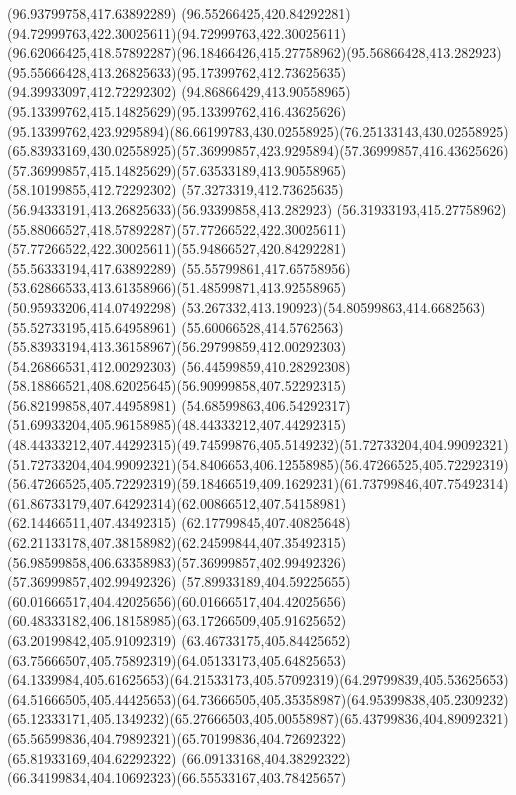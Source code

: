 {{\lineto(96.93799758,417.63892289)
\curveto(96.55266425,420.84292281)(94.72999763,422.30025611)(94.72999763,422.30025611)
\curveto(96.62066425,418.57892287)(96.18466426,415.27758962)(95.56866428,413.282923)
\curveto(95.55666428,413.26825633)(95.17399762,412.73625635)(94.39933097,412.72292302)
\curveto(94.86866429,413.90558965)(95.13399762,415.14825629)(95.13399762,416.43625626)
\curveto(95.13399762,423.9295894)(86.66199783,430.02558925)(76.25133143,430.02558925)
\curveto(65.83933169,430.02558925)(57.36999857,423.9295894)(57.36999857,416.43625626)
\curveto(57.36999857,415.14825629)(57.63533189,413.90558965)(58.10199855,412.72292302)
\curveto(57.3273319,412.73625635)(56.94333191,413.26825633)(56.93399858,413.282923)
\curveto(56.31933193,415.27758962)(55.88066527,418.57892287)(57.77266522,422.30025611)
\curveto(57.77266522,422.30025611)(55.94866527,420.84292281)(55.56333194,417.63892289)
\lineto(55.55799861,417.65758956)
\curveto(53.62866533,413.61358966)(51.48599871,413.92558965)(50.95933206,414.07492298)
\curveto(53.267332,413.190923)(54.80599863,414.6682563)(55.52733195,415.64958961)
\curveto(55.60066528,414.5762563)(55.83933194,413.36158967)(56.29799859,412.00292303)
\lineto(54.26866531,412.00292303)
\lineto(56.44599859,410.28292308)
\curveto(58.18866521,408.62025645)(56.90999858,407.52292315)(56.82199858,407.44958981)
\curveto(54.68599863,406.54292317)(51.69933204,405.96158985)(48.44333212,407.44292315)
\curveto(48.44333212,407.44292315)(49.74599876,405.5149232)(51.72733204,404.99092321)
\curveto(51.72733204,404.99092321)(54.8406653,406.12558985)(56.47266525,405.72292319)
\curveto(56.47266525,405.72292319)(59.18466519,409.1629231)(61.73799846,407.75492314)
\curveto(61.86733179,407.64292314)(62.00866512,407.54158981)(62.14466511,407.43492315)
\curveto(62.17799845,407.40825648)(62.21133178,407.38158982)(62.24599844,407.35492315)
\curveto(56.98599858,406.63358983)(57.36999857,402.99492326)(57.36999857,402.99492326)
\curveto(57.89933189,404.59225655)(60.01666517,404.42025656)(60.01666517,404.42025656)
\curveto(60.48333182,406.18158985)(63.17266509,405.91625652)(63.20199842,405.91092319)
\curveto(63.46733175,405.84425652)(63.75666507,405.75892319)(64.05133173,405.64825653)
\curveto(64.1339984,405.61625653)(64.21533173,405.57092319)(64.29799839,405.53625653)
\curveto(64.51666505,405.44425653)(64.73666505,405.35358987)(64.95399838,405.2309232)
\curveto(65.12333171,405.1349232)(65.27666503,405.00558987)(65.43799836,404.89092321)
\curveto(65.56599836,404.79892321)(65.70199836,404.72692322)(65.81933169,404.62292322)
\curveto(66.09133168,404.38292322)(66.34199834,404.10692323)(66.55533167,403.78425657)
}}
